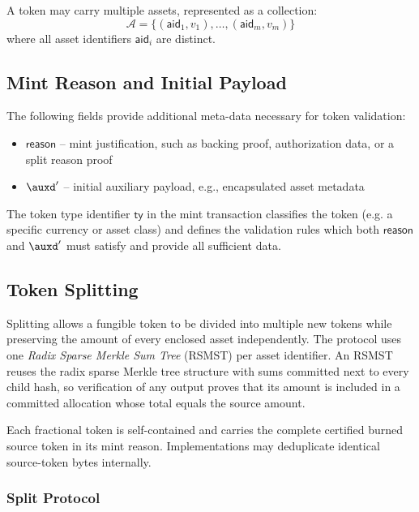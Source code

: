 A token may carry multiple assets, represented as a collection:
\[
\mathcal{A} = \{(\mathsf{aid}_1, v_1), \ldots, (\mathsf{aid}_m, v_m)\}
\]
where all asset identifiers $\mathsf{aid}_i$ are distinct.

\subsection{Mint Reason and Initial Payload}\label{sec:mint-justification}

The following fields provide additional meta-data necessary for token validation:
\begin{itemize}
	\item $\mathsf{reason}$ -- mint justification, such as backing proof, authorization data, or a split reason proof
	\item $\auxd'$ -- initial auxiliary payload, e.g., encapsulated asset metadata
\end{itemize}

The token type identifier $\mathsf{ty}$ in the mint transaction classifies the token (e.g. a specific currency or asset class) and defines the validation rules which both $\mathsf{reason}$ and $\auxd'$ must satisfy and provide all sufficient data.

\subsection{Token Splitting}\label{sec:token-splitting}

Splitting allows a fungible token to be divided into multiple new tokens while preserving the amount of every enclosed asset independently.  The protocol uses one \emph{Radix Sparse Merkle Sum Tree} (RSMST) per asset identifier.  An RSMST reuses the radix sparse Merkle tree structure with sums committed next to every child hash, so verification of any output proves that its amount is included in a committed allocation whose total equals the source amount.

Each fractional token is self-contained and carries the complete certified burned source token in its mint reason. Implementations may deduplicate identical source-token bytes internally.

\subsubsection{Split Protocol}

